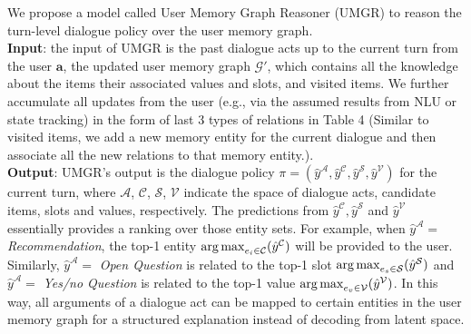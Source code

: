 We propose a model called User Memory Graph Reasoner (UMGR) to reason the turn-level dialogue policy over the user memory graph.\\ 
\textbf{Input}: the input of UMGR is the past dialogue acts up to the current turn from the user $\boldsymbol{a}$, the updated user memory graph $\mathcal{G}'$, which contains all the knowledge about the items their associated values and slots, and visited items. We further accumulate all updates from the user (e.g., via the assumed results from NLU or state tracking) in the form of last 3 types of relations in Table 4 (Similar to visited items, we add a new memory entity for the current dialogue and then associate all the new relations to that memory entity.).\\
\textbf{Output}: UMGR's output is the dialogue policy $\pi=(\hat{y}^\mathcal{A}, \hat{y}^\mathcal{C}, \hat{y}^\mathcal{S}, \hat{y}^\mathcal{V})$ for the current turn, where $\mathcal{A}$, $\mathcal{C}$, $\mathcal{S}$, $\mathcal{V}$ indicate the space of dialogue acts, candidate items, slots and values, respectively.
The predictions from $\hat{y}^\mathcal{C}, \hat{y}^\mathcal{S}$ and $\hat{y}^\mathcal{V}$ essentially provides a ranking over those entity sets.
For example, when $\hat{y}^\mathcal{A}=$ \textit{Recommendation}, the top-1 entity $\operatorname*{arg\,max}_{e_i \in \mathcal{C}}(\hat{y}^\mathcal{C})$ will be provided to the user.
Similarly, $\hat{y}^\mathcal{A}=$ \textit{Open Question} is related to the top-1 slot $\operatorname*{arg\,max}_{e_s \in \mathcal{S}}(\hat{y}^\mathcal{S})$ and $\hat{y}^\mathcal{A}=$ \textit{Yes/no Question} is related to the top-1 value $\operatorname*{arg\,max}_{e_v \in \mathcal{V}}(\hat{y}^\mathcal{V})$.
In this way, all arguments of a dialogue act can be mapped to certain entities in the user memory graph for a structured explanation instead of decoding from latent space.

